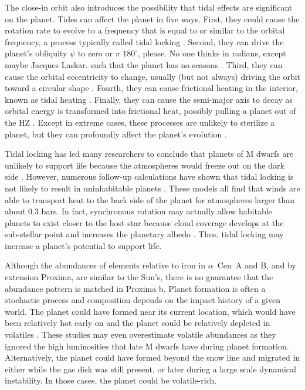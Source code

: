 \documentclass[preprint,12pt]{aastex}
\newcommand{\xxx}[1]{{\color{red} #1}} %
\def\acen{{$\alpha$~Cen}}
\begin{document}
The close-in orbit also introduces the possibility that tidal effects
are significant on the planet. Tides can affect the planet in five
ways. First, they could cause the rotation rate to evolve to a
frequency that is equal to or similar to the orbital frequency, a
process typically called tidal locking
\citep{Dole64,Kasting93,Barnes16}. Second, they can drive the planet's
obliquity $\psi$ to zero or $\pi$ \xxx{$180^{\circ}$, please. No one thinks in 
radians, except maybe Jacques Laskar.} such that the planet has no seasons
\citep{Heller11}. Third, they can cause the orbital eccentricity to
change, usually (but not always) driving the orbit toward a circular
shape \citep{Darwin1880,FerrazMello08}. Fourth, they can cause
frictional heating in the interior, known as tidal heating
\citep{Peale79,Jackson08c,Barnes13}. Finally, they can cause the
semi-major axis to decay as orbital energy is transformed into
frictional heat, possibly pulling a planet out of the HZ
\citep{Darwin1880,Barnes08}. Except in extreme cases, these processes
are unlikely to sterilize a planet, but they can profoundly affect the
planet's evolution \citep{DriscollBarnes15}.

Tidal locking has led many researchers to conclude that planets of M
dwarfs are unlikely to support life because the atmospheres would
freeze out on the dark side \citep{Kasting93}. However, numerous
follow-up calculations have shown that tidal locking is not likely to
result in uninhabitable planets
\citep{Joshi97,Pierrehumbert11,Wordsworth11,Yang13,Shields16}. These
models all find that winds are able to transport heat to the back side
of the planet for atmospheres larger than about 0.3 bars. In fact,
synchronous rotation may actually allow habitable planets to exist
closer to the host star because cloud coverage develops at the
sub-stellar point and increases the planetary albedo
\citep{Yang13}. Thus, tidal locking may increase a planet's potential
to support life.

Although the abundances of elements relative to iron in \acen~A and B,
and by extension Proxima, are similar to the Sun's, there is no
guarantee that the abundance pattern is matched in Proxima
b. Planet formation is often a stochastic process and composition
depends on the impact history of a given world. The planet could have
formed near its current location, which would have been relatively hot
early on and the planet could be relatively depleted in volatiles
\citep{Raymond07,Mulders15}. These studies may even overestimate
volatile abundances as they ignored the high luminosities that late M
dwarfs have during planet formation. Alternatively, the planet could
have formed beyond the snow line and migrated in either while the gas
disk was still present, or later during a large scale dynamical
instability. In those cases, the planet could be
volatile-rich.
\end{document}
